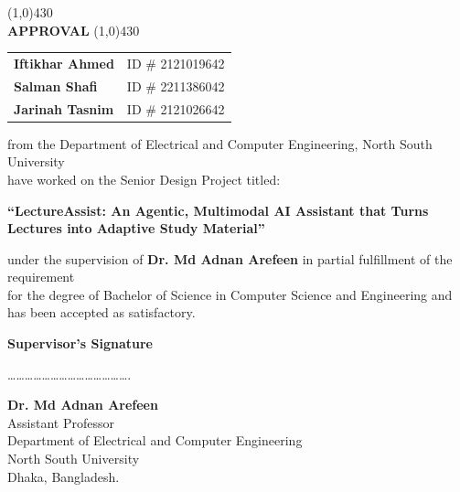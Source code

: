 \begin{titlepage}

\begin{center}
\line(1,0){430}\\
{\Huge \bf APPROVAL}
\line(1,0){430}
\end{center}

\vfill

\begin{center}
\begin{tabular}{ll}
\textbf{Iftikhar Ahmed}  & ID \# 2121019642 \\
\textbf{Salman Shafi}    & ID \# 2211386042 \\
\textbf{Jarinah Tasnim}  & ID \# 2121026642 \\
\end{tabular}

\vspace{1em}

from the Department of Electrical and Computer Engineering, North South University \\
have worked on the Senior Design Project titled: \\

\vspace{1em}

{\Large \bf “LectureAssist: An Agentic, Multimodal AI Assistant that Turns Lectures into Adaptive Study Material”}

\vspace{1em}

under the supervision of \textbf{Dr. Md Adnan Arefeen} in partial fulfillment of the requirement \\
for the degree of Bachelor of Science in Computer Science and Engineering and has been accepted as satisfactory.
\end{center}

\vfill
\vfill

\begin{flushleft}
\textbf{Supervisor’s Signature}

\vspace{2em}

…………………………………….

\textbf{Dr. Md Adnan Arefeen} \\
Assistant Professor \\
Department of Electrical and Computer Engineering \\
North South University \\
Dhaka, Bangladesh.
\end{flushleft}


\end{titlepage}
